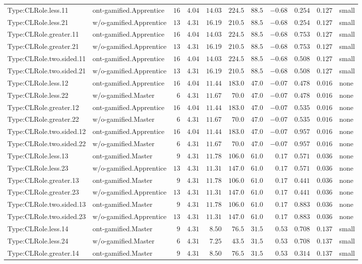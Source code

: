 \documentclass[6pt,a4paper]{article}
\begin{document}
{\begin{longtable}{llrrrrrrrrl}
Type:CLRole.less.11&ont-gamified.Apprentice&$16$&$4.04$&$14.03$&$224.5$&$ 88.5$&$-0.68$&$0.254$&$0.127$&small\tabularnewline
Type:CLRole.less.21&w/o-gamified.Apprentice&$13$&$4.31$&$16.19$&$210.5$&$ 88.5$&$-0.68$&$0.254$&$0.127$&small\tabularnewline
Type:CLRole.greater.11&ont-gamified.Apprentice&$16$&$4.04$&$14.03$&$224.5$&$ 88.5$&$-0.68$&$0.753$&$0.127$&small\tabularnewline
Type:CLRole.greater.21&w/o-gamified.Apprentice&$13$&$4.31$&$16.19$&$210.5$&$ 88.5$&$-0.68$&$0.753$&$0.127$&small\tabularnewline
Type:CLRole.two.sided.11&ont-gamified.Apprentice&$16$&$4.04$&$14.03$&$224.5$&$ 88.5$&$-0.68$&$0.508$&$0.127$&small\tabularnewline
Type:CLRole.two.sided.21&w/o-gamified.Apprentice&$13$&$4.31$&$16.19$&$210.5$&$ 88.5$&$-0.68$&$0.508$&$0.127$&small\tabularnewline
Type:CLRole.less.12&ont-gamified.Apprentice&$16$&$4.04$&$11.44$&$183.0$&$ 47.0$&$-0.07$&$0.478$&$0.016$&none\tabularnewline
Type:CLRole.less.22&w/o-gamified.Master&$ 6$&$4.31$&$11.67$&$ 70.0$&$ 47.0$&$-0.07$&$0.478$&$0.016$&none\tabularnewline
Type:CLRole.greater.12&ont-gamified.Apprentice&$16$&$4.04$&$11.44$&$183.0$&$ 47.0$&$-0.07$&$0.535$&$0.016$&none\tabularnewline
Type:CLRole.greater.22&w/o-gamified.Master&$ 6$&$4.31$&$11.67$&$ 70.0$&$ 47.0$&$-0.07$&$0.535$&$0.016$&none\tabularnewline
Type:CLRole.two.sided.12&ont-gamified.Apprentice&$16$&$4.04$&$11.44$&$183.0$&$ 47.0$&$-0.07$&$0.957$&$0.016$&none\tabularnewline
Type:CLRole.two.sided.22&w/o-gamified.Master&$ 6$&$4.31$&$11.67$&$ 70.0$&$ 47.0$&$-0.07$&$0.957$&$0.016$&none\tabularnewline
Type:CLRole.less.13&ont-gamified.Master&$ 9$&$4.31$&$11.78$&$106.0$&$ 61.0$&$ 0.17$&$0.571$&$0.036$&none\tabularnewline
Type:CLRole.less.23&w/o-gamified.Apprentice&$13$&$4.31$&$11.31$&$147.0$&$ 61.0$&$ 0.17$&$0.571$&$0.036$&none\tabularnewline
Type:CLRole.greater.13&ont-gamified.Master&$ 9$&$4.31$&$11.78$&$106.0$&$ 61.0$&$ 0.17$&$0.441$&$0.036$&none\tabularnewline
Type:CLRole.greater.23&w/o-gamified.Apprentice&$13$&$4.31$&$11.31$&$147.0$&$ 61.0$&$ 0.17$&$0.441$&$0.036$&none\tabularnewline
Type:CLRole.two.sided.13&ont-gamified.Master&$ 9$&$4.31$&$11.78$&$106.0$&$ 61.0$&$ 0.17$&$0.883$&$0.036$&none\tabularnewline
Type:CLRole.two.sided.23&w/o-gamified.Apprentice&$13$&$4.31$&$11.31$&$147.0$&$ 61.0$&$ 0.17$&$0.883$&$0.036$&none\tabularnewline
Type:CLRole.less.14&ont-gamified.Master&$ 9$&$4.31$&$ 8.50$&$ 76.5$&$ 31.5$&$ 0.53$&$0.708$&$0.137$&small\tabularnewline
Type:CLRole.less.24&w/o-gamified.Master&$ 6$&$4.31$&$ 7.25$&$ 43.5$&$ 31.5$&$ 0.53$&$0.708$&$0.137$&small\tabularnewline
Type:CLRole.greater.14&ont-gamified.Master&$ 9$&$4.31$&$ 8.50$&$ 76.5$&$ 31.5$&$ 0.53$&$0.314$&$0.137$&small\tabularnewline

\end{longtable}}
\end{document}

